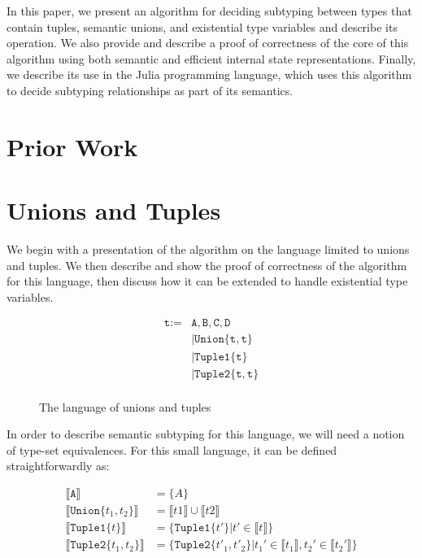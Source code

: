 \documentclass[a4paper,UKenglish]{lipics-v2018}
\newcommand{\xt}[1]{\texttt{#1}}
\newcommand{\tupleo}[1]{\xt{Tuple1\{}#1\xt{\}}}
\newcommand{\tuplet}[2]{\xt{Tuple2\{}#1,#2\xt{\}}}
\newcommand{\union}[2]{\xt{Union\{}#1,#2\xt{\}}}
\newcommand{\denotes}[1]{\llbracket #1 \rrbracket}
\begin{document}
In this paper, we present an algorithm for deciding subtyping between types
that contain tuples, semantic unions, and existential type variables and
describe its operation. We also provide and describe a proof of correctness of
the core of this algorithm using both semantic and efficient internal state
representations. Finally, we describe its use in the Julia programming
language, which uses this algorithm to decide subtyping relationships as part
of its semantics.

\section{Prior Work}

\section{Unions and Tuples}

We begin with a presentation of the algorithm on the language limited to unions
and tuples. We then describe and show the proof of correctness of the algorithm
for this language, then discuss how it can be extended to handle existential type
variables.

\begin{figure}
\begin{align*}
\xt{t} := & \xt{A},\xt{B},\xt{C},\xt{D} \\
&| \union{\xt t}{\xt t} \\
&| \tupleo{\xt t} \\
&| \tuplet{\xt t}{\xt t} \\
\end{align*}
\caption{The language of unions and tuples}
\label{fig:unionlang}
\end{figure}

In order to describe semantic subtyping for this language, we will need a
notion of type-set equivalences. For this small language, it can be defined
straightforwardly as:

\begin{align*}
\denotes{\xt{A}} &= \{A\} \\
\denotes{\union{t_1}{t_2}} &= \denotes{t1} \cup \denotes{t2} \\
\denotes{\tupleo{t}} &= \{\tupleo{t'} | t' \in \denotes{t}\} \\
\denotes{\tuplet{t_1}{t_2}} &= \{\tuplet{t'_1}{t'_2} | t_1' \in \denotes{t_1},  t_2' \in \denotes{t_2'}\} \\
\end{align*}
\end{document}
